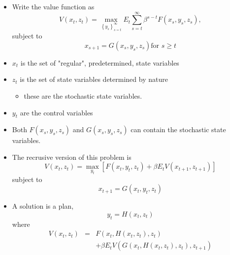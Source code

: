 \documentclass[notes=show]{beamer}
\begin{document}
\begin{frame}%


\begin{itemize}
\item Write the value function as%
\[
V(x_{t},z_{t})=\max_{\left\{ y_{s}\right\} _{s=t}^{\infty
}}E_{t}\sum_{s=t}^{\infty }\beta ^{s-t}F(x_{s},y_{s},z_{s}), 
\]%
subject to 
\[
x_{s+1}=G(x_{s},y_{s},z_{s})\text{for }s\geq t 
\]

\item $x_{t}$ is the set of "regular", predetermined, state variables

\item $z_{t}$ is the set of state variables determined by nature

\begin{itemize}
\item these are the stochastic state variables.
\end{itemize}

\item $y_{t}$ are the control variables \ 

\item Both $F(x_{s},y_{s},z_{s})$ and $G(x_{s},y_{s},z_{s})$ can contain the
stochastic state variables.
\end{itemize}

\end{frame}%

\begin{frame}%


\begin{itemize}
\item The recrusive version of this problem is%
\[
V(x_{t},z_{t})=\max_{y_{t}}\left[ F(x_{t},y_{t},z_{t})+\beta
E_{t}V(x_{t+1},z_{t+1})\right] 
\]%
subject to 
\[
x_{t+1}=G(x_{t},y_{t},z_{t}) 
\]

\item A solution is a plan,%
\[
y_{t}=H(x_{t},z_{t}) 
\]%
where%
\begin{eqnarray*}
V(x_{t},z_{t}) &=&F(x_{t},H(x_{t},z_{t}),z_{t}) \\
&&+\beta E_{t}V(G(x_{t},H(x_{t},z_{t}),z_{t}),z_{t+1})
\end{eqnarray*}
\end{itemize}

\end{frame}%
\end{document}
